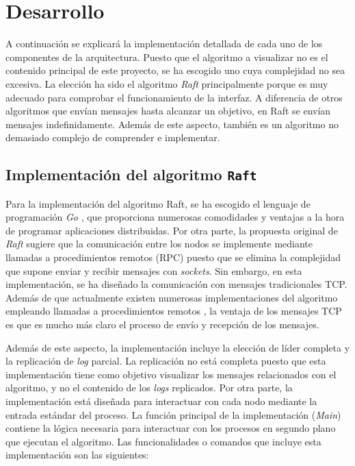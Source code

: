 \chapter{Desarrollo}

A continuación se explicará la implementación detallada de cada uno de los componentes de la arquitectura. Puesto que el algoritmo a visualizar no es el contenido principal de este proyecto, se ha escogido uno cuya complejidad no sea excesiva. La elección ha sido el algoritmo \textit{Raft} \cite{10.5555/2643634.2643666} principalmente porque es muy adecuado para comprobar el funcionamiento de la interfaz. A diferencia de otros algoritmos que envían mensajes hasta alcanzar un objetivo, en Raft se envían mensajes indefinidamente. Además de este aspecto, también es un algoritmo no demasiado complejo de comprender e implementar.

\section{Implementación del algoritmo \texttt{Raft}}
\label{sec:raft}

Para la implementación del algoritmo Raft, se ha escogido el lenguaje de programación \textit{Go} \cite{go}, que proporciona numerosas comodidades y ventajas a la hora de programar aplicaciones distribuidas. Por otra parte, la propuesta original de \textit{Raft} \cite{raft1} sugiere que la comunicación entre los nodos se implemente mediante llamadas a procedimientos remotos (RPC) puesto que se elimina la complejidad que supone enviar y recibir mensajes con \textit{sockets}. Sin embargo, en esta implementación, se ha diseñado la comunicación con mensajes tradicionales TCP. Además de que actualmente existen numerosas implementaciones del algoritmo empleando llamadas a procedimientos remotos \cite{raftetcd}\cite{rafteliben}, la ventaja de los mensajes TCP es que es mucho más claro el proceso de envío y recepción de los mensajes.

Además de este aspecto, la implementación incluye la elección de líder completa y la replicación de \textit{log} parcial. La replicación no está completa puesto que esta implementación tiene como objetivo visualizar los mensajes relacionados con el algoritmo, y no el contenido de los \textit{logs} replicados. Por otra parte, la implementación está diseñada para interactuar con cada nodo mediante la entrada estándar del proceso. La función principal de la implementación (\textit{Main}) contiene la lógica necesaria para interactuar con los procesos en segundo plano que ejecutan el algoritmo. Las funcionalidades o comandos que incluye esta implementación son las siguientes:

